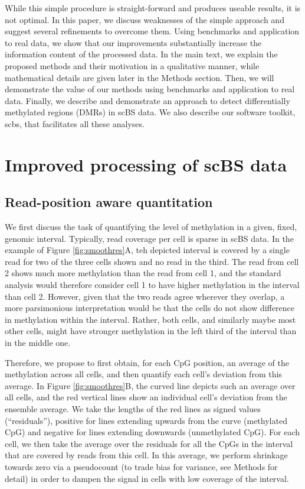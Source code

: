 \documentclass[twocolumn,10pt]{article}
\begin{document}
While this simple procedure is straight-forward and produces useable results, it is not optimal. In this paper, we discuss weaknesses of the simple approach and suggest several refinements to overcome them. Using benchmarks and application to real data, we show that our improvements substantially increase the information content of the processed data. In the main text, we explain the proposed methods and their motivation in a qualitative manner, while mathematical details are given later in the Methods section. Then, we will demonstrate the value of our methods using benchmarks and application to real data. Finally, we describe and demonstrate an approach to detect differentially methylated regions (DMRs) in scBS data. We also describe our software toolkit, scbs, that facilitates all these analyses.

\section{Improved processing of scBS data}

\subsection{Read-position aware quantitation} \label{residuals}

We first discuss the task of quantifying the level of methylation in a given, fixed, genomic interval. Typically, read coverage per cell is sparse in scBS data. In the example of Figure \ref{fig:smoothres}A, teh depicted interval is covered by a single read for two of the three cells shown and no read in the third. The read from cell 2 shows much more methylation than the read from cell 1, and the standard analysis would therefore consider cell 1 to have higher methylation in the interval than cell 2.
However, given that the two reads agree wherever they overlap, a more parsimonious interpretation would be that the cells do not show difference in methylation within the interval.
Rather, both cells, and similarly maybe most other cells, might have stronger methylation in the left third of the interval than in the middle one.

Therefore, we propose to first obtain, for each CpG position, an average of the methylation across all cells, and then quantify each cell's deviation from this average.
In Figure \ref{fig:smoothres}B, the curved line depicts such an average over all cells, and the red vertical lines show an individual cell's deviation from the ensemble average.
We take the lengths of the red lines as signed values (``residuals''), positive for lines extending upwards from the curve (methylated CpG) and negative for lines extending downwards (unmethylated CpG). For each cell, we then take the average over the residuals for all the CpGs in the interval that are covered by reads from this cell.
In this average, we perform shrinkage towards zero via a pseudocount (to trade bias for variance, see Methods for detail) in order to dampen the signal in cells with low coverage of the interval.
\end{document}
